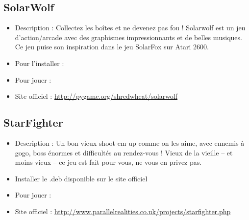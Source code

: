 \subsection{SolarWolf}
\begin{itemize}
\begingroup
{}
\item Description : Collectez les boîtes et ne devenez pas fou ! Solarwolf est un jeu d'action/arcade avec des graphismes impressionnants et de belles musiques. Ce jeu puise son inspiration dans le jeu SolarFox sur Atari 2600.{\par}
\item Pour l'installer : 
\item Pour jouer : 
\item Site officiel : \url{http://pygame.org/shredwheat/solarwolf}{\par}
\endgroup
\end{itemize}
\subsection{StarFighter}
\begin{itemize}
\begingroup
{}
\item Description : Un bon vieux shoot-em-up comme on les aime, avec ennemis à gogo, boss énormes et difficultés au rendez-vous ! Vieux de la vieille -- et moins vieux -- ce jeu est fait pour vous, ne vous en privez pas.{\par}
\endgroup
\item Installer le .deb disponible sur le site officiel{\par}
\item Pour jouer : 
\item Site officiel : \url{http://www.parallelrealities.co.uk/projects/starfighter.php}{\par}
\end{itemize}
